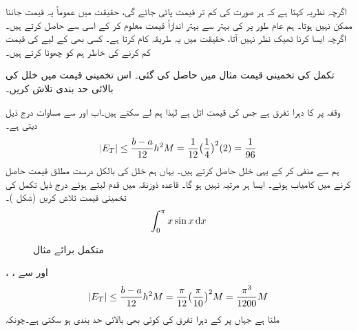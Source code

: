 اگرچہ نظریہ کہتا ہے کہ ہر صورت  کی کم تر قیمت پائی جائے گی،  حقیقت میں عموماً  یہ قیمت جاننا ممکن نہیں ہوتا۔ ہم عام طور پر  کی بہتر سے بہتر اندازاً قیمت معلوم کر کے اسی سے  حاصل کرتے ہیں۔ اگرچہ ایسا کرنا ٹھیک نظر نہیں آتا، حقیقت میں یہ طریقہ  کام کرتا ہے۔  کسی بھی  کے لیے  کی قیمت کم کرنے کی خاطر ہم  کو چھوٹا کرتے ہیں۔ 

تکمل  کی تخمینی قیمت مثال  میں حاصل کی گئی۔ اس تخمینی قیمت میں خلل کی بالائی حد بندی تلاش کریں۔

وقفہ  پر  کا دہرا تفرق  ہے جس کی قیمت اٹل ہے لہٰذا ہم  لے سکتے ہیں۔اب  اور  سے مساوات  درج ذیل دیتی ہے۔ 
\begin{align*}
\abs{E_T}\le \frac{b-a}{12}h^2M=\frac{1}{12}\big(\frac{1}{4}\big)^2(2)=\frac{1}{96}
\end{align*}
ہم  سے  منفی کر کے یہی خلل
  حاصل کرتے ہیں۔ یہاں ہم خلل کی بالکل درست مطلق قیمت حاصل کرنے میں کامیاب ہوئے۔ ایسا ہر  مرتبہ نہیں ہو گا۔
قاعدہ ذوزنقہ میں  قدم لیتے ہوئے درج ذیل تکمل کی تخمینی قیمت تلاش کریں (شکل )۔
\begin{align*}
\int_0^{\pi}x\sin x\dif x
\end{align*}
%
\begin{figure}
\centering
{}
\caption{متکمل برائے مثال }
\label{شکل_مثال_تکمل_خلل_درکار}
\end{figure}
، ،  اور  سے
\begin{align*}
\abs{E_T}\le \frac{b-a}{12}h^2M=\frac{\pi}{12}\big(\frac{\pi}{10}\big)^2M=\frac{\pi^3}{1200}M
\end{align*}
ملتا ہے جہاں  پر  کے دہرا تفرق کی کوئی بھی بالائی حد بندی ہو سکتی ہے۔چونکہ
